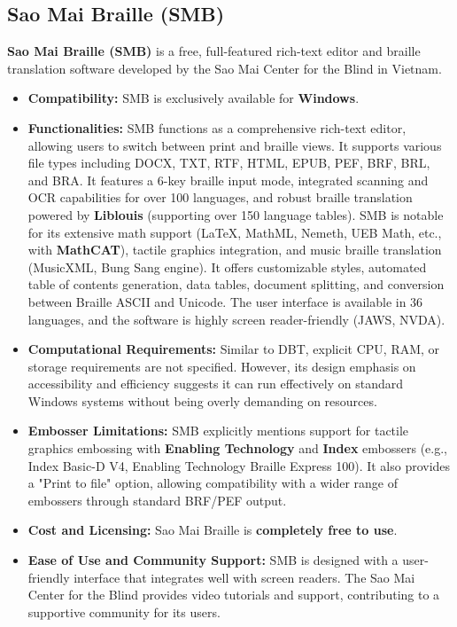 \subsection{Sao Mai Braille (SMB)}
\textbf{Sao Mai Braille (SMB)} is a free, full-featured rich-text editor and braille translation software developed by the Sao Mai Center for the Blind in Vietnam.

\begin{itemize}
\item \textbf{Compatibility:} SMB is exclusively available for \textbf{Windows}\footnotemark[9].
\item \textbf{Functionalities:} SMB functions as a comprehensive rich-text editor, allowing users to switch between print and braille views. It supports various file types including DOCX, TXT, RTF, HTML, EPUB, PEF, BRF, BRL, and BRA. It features a 6-key braille input mode, integrated scanning and OCR capabilities for over 100 languages, and robust braille translation powered by \textbf{Liblouis} (supporting over 150 language tables). SMB is notable for its extensive math support (LaTeX, MathML, Nemeth, UEB Math, etc., with \textbf{MathCAT}), tactile graphics integration, and music braille translation (MusicXML, Bung Sang engine). It offers customizable styles, automated table of contents generation, data tables, document splitting, and conversion between Braille ASCII and Unicode. The user interface is available in 36 languages, and the software is highly screen reader-friendly (JAWS, NVDA)\footnotemark[9].
\item \textbf{Computational Requirements:} Similar to DBT, explicit CPU, RAM, or storage requirements are not specified. However, its design emphasis on accessibility and efficiency suggests it can run effectively on standard Windows systems without being overly demanding on resources.
\item \textbf{Embosser Limitations:} SMB explicitly mentions support for tactile graphics embossing with \textbf{Enabling Technology} and \textbf{Index} embossers (e.g., Index Basic-D V4, Enabling Technology Braille Express 100). It also provides a "Print to file" option, allowing compatibility with a wider range of embossers through standard BRF/PEF output\footnotemark[9].
\item \textbf{Cost and Licensing:} Sao Mai Braille is \textbf{completely free to use}\footnotemark[9].
\item \textbf{Ease of Use and Community Support:} SMB is designed with a user-friendly interface that integrates well with screen readers. The Sao Mai Center for the Blind provides video tutorials and support, contributing to a supportive community for its users\footnotemark[9].
\end{itemize}

